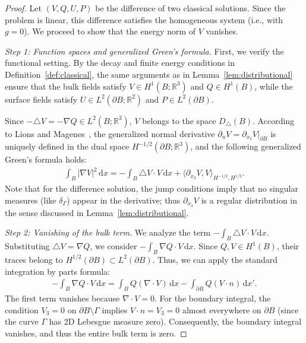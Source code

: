 \documentclass{article}
\theoremstyle{remark}
\theoremstyle{definition}
\numberwithin{equation}{section}
\begin{document}
\begin{proof}
    Let $(V,Q,U,P)$ be the difference of two classical solutions. Since the problem is linear, this difference satisfies the homogeneous system (i.e., with $g = 0$). We proceed to show that the energy norm of $V$ vanishes.

    \textit{Step 1: Function spaces and generalized Green's formula.}
    First, we verify the functional setting. By the decay and finite energy conditions in Definition~\ref{def:classical}, the same arguments as in Lemma~\ref{lem:distributional} ensure that the bulk fields satisfy $V \in H^1(B; \mathbb{R}^3)$ and $Q \in H^1(B)$, while the surface fields satisfy $U \in L^2(\partial B; \mathbb{R}^2)$ and $P \in L^2(\partial B)$.

    Since $-\triangle V = -\nabla Q \in L^2(B; \mathbb{R}^3)$, $V$ belongs to the space $D_\triangle(B)$. According to Lions and Magenes~\cite{lions1972non}, the generalized normal derivative $\partial_{n}V = \partial_{x_3}V|_{\partial B}$ is uniquely defined in the dual space $H^{-1/2}(\partial B; \mathbb{R}^3)$, and the following generalized Green's formula holds:
    \begin{align}\label{eq:green_id}
        \int_B|\nabla V|^2\,\mathrm{d}x = -\int_B\triangle V\cdot V\,\mathrm{d}x + \langle\partial_{x_3}V, V\rangle_{H^{-1/2},H^{1/2}}.
    \end{align}
    Note that for the difference solution, the jump conditions imply that no singular measures (like $\delta_\Gamma$) appear in the derivative; thus $\partial_{x_3}V$ is a regular distribution in the sense discussed in Lemma~\ref{lem:distributional}.

    \textit{Step 2: Vanishing of the bulk term.}
    We analyze the term $-\int_B\triangle V\cdot V\,\mathrm{d}x$. Substituting $\triangle V = \nabla Q$, we consider $-\int_B\nabla Q \cdot V\,\mathrm{d}x$.
    Since $Q, V \in H^1(B)$, their traces belong to $H^{1/2}(\partial B) \subset L^2(\partial B)$. Thus, we can apply the standard integration by parts formula:
    \begin{align*}
        -\int_B\nabla Q\cdot V\,\mathrm{d}x
        = \int_BQ(\nabla\cdot V)\,\mathrm{d}x - \int_{\partial B}Q(V\cdot n)\,\mathrm{d}x'.
    \end{align*}
    The first term vanishes because $\nabla \cdot V = 0$. For the boundary integral, the condition $V_3 = 0$ on $\partial B\setminus\Gamma$ implies $V \cdot n = V_3 = 0$ almost everywhere on $\partial B$ (since the curve $\Gamma$ has 2D Lebesgue measure zero). Consequently, the boundary integral vanishes, and thus the entire bulk term is zero.


\end{proof}
\end{document}
